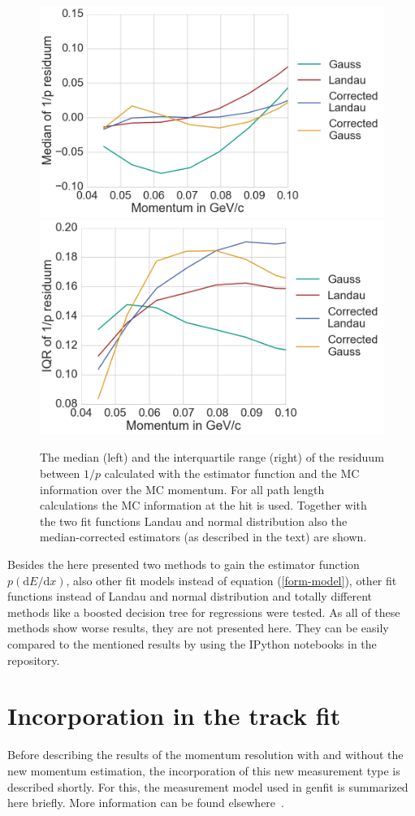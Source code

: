 \begin{figure}
  \centering
   \includegraphics[width=0.48\linewidth]{figures/vxd/divPMedian.png}
   \includegraphics[width=0.48\linewidth]{figures/vxd/divPIQR.png}
  \caption[Median and IQR of $1/p$.]{The median (left) and the interquartile range (right) of the residuum between $1/p$ calculated with the estimator function and the MC information over the MC momentum. For all path length calculations the MC information at the hit is used. Together with the two fit functions Landau and normal distribution also the median-corrected estimators (as described in the text) are shown.}
  \label{fig-divp-residuum}
\end{figure}


Besides the here presented two methods to gain the estimator function $p(\mathrm dE/\mathrm dx)$, also other fit models instead of equation (\ref{form-model}), other fit functions instead of Landau and normal distribution and totally different methods like a boosted decision tree for regressions were tested. As all of these methods show worse results, they are not presented here. They can be easily compared to the mentioned results by using the IPython notebooks in the repository.

\section{Incorporation in the track fit}

Before describing the results of the momentum resolution with and without the new momentum estimation, the incorporation of this new measurement type is described shortly. For this, the measurement model used in genfit is summarized here briefly. More information can be found elsewhere~\cite{genfit}.


